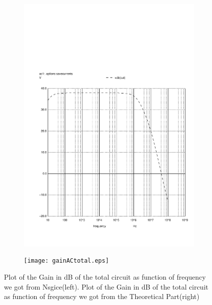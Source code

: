 \begin{figure}[h]
    \centering
    \begin{subfigure}{0.23\textwidth}
        \includegraphics[width=\linewidth, clip]{vo2f.pdf}
        \label{fig:output1}
    \end{subfigure}
    \begin{subfigure}{0.23\textwidth}
        \texttt{[image: gainACtotal.eps]}
        \label{fig:output2}
    \end{subfigure}
    \caption{\small Plot of the Gain in dB of the total circuit as function of frequency we got from Nsgice(left).
        Plot of the Gain in dB of the total circuit as function of frequency we got from the Theoretical Part(right)}
    \label{output_deviation}
\end{figure}


